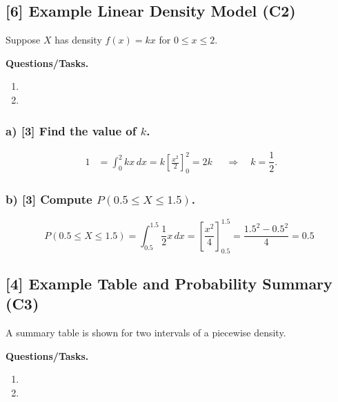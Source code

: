 \subsection{[6] Example Linear Density Model (C2)}
\label{sec:example-linear-density-model-c2}
Suppose $X$ has density $f(x)=kx$ for $0\le x\le 2$.

\textbf{Questions/Tasks.}
\begin{enumerate}[label=\textbf{\alph*)}]
    \item {}
    \item {}
\end{enumerate}

\subsubsection*{a) [3] Find the value of $k$.}
\label{subsec:example-linear-density-model-c2-a}
\[
\begin{aligned}
1&=\int_0^2 kx\,dx
= k\left[\frac{x^2}{2}\right]_0^2
=2k
\end{aligned}
\quad\Rightarrow\quad k=\frac12.
\]



\subsubsection*{b) [3] Compute $P(0.5\le X\le 1.5)$.}
\label{subsec:example-linear-density-model-c2-b}
\[
P(0.5\le X\le 1.5)=\int_{0.5}^{1.5}\frac12x\,dx
=\left[\frac{x^2}{4}\right]_{0.5}^{1.5}=\frac{1.5^2-0.5^2}{4}=0.5
\]


\subsection{[4] Example Table and Probability Summary (C3)}
\label{sec:example-table-and-probability-summary-c3}
A summary table is shown for two intervals of a piecewise density.

\textbf{Questions/Tasks.}
\begin{enumerate}[label=\textbf{\alph*)}]
    \item {}
    \item {}
\end{enumerate}

